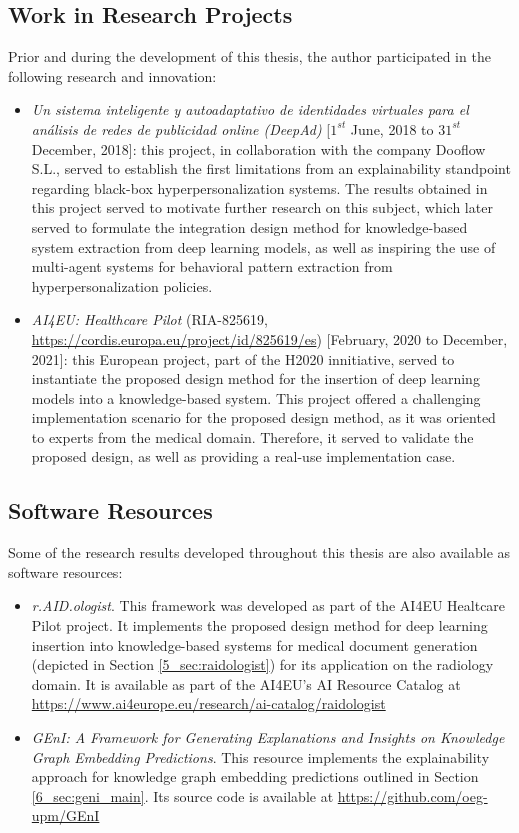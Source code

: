 \subsection{Work in Research Projects}
Prior and during the development of this thesis, the author participated in the following research and innovation:
\begin{itemize}
    \item \textit{Un sistema inteligente y autoadaptativo de identidades virtuales para el análisis de redes de publicidad online (DeepAd)} [$1^{st}$ June, 2018 to $31^{st}$ December, 2018]: this project, in collaboration with the company Dooflow S.L., served to establish the first limitations from an explainability standpoint regarding black-box hyperpersonalization systems. The results obtained in this project served to motivate further research on this subject, which later served to formulate the integration design method for knowledge-based system extraction from deep learning models, as well as inspiring the use of multi-agent systems for behavioral pattern extraction from hyperpersonalization policies.
    
    \item \textit{AI4EU: Healthcare Pilot} (RIA-825619, \url{https://cordis.europa.eu/project/id/825619/es}) [February, 2020 to December, 2021]: this European project, part of the H2020 innitiative, served to instantiate the proposed design method for the insertion of deep learning models into a knowledge-based system. This project offered a challenging implementation scenario for the proposed design method, as it was oriented to experts from the medical domain. Therefore, it served to validate the proposed design, as well as providing a real-use implementation case. 
\end{itemize}
\subsection{Software Resources}
Some of the research results developed throughout this thesis are also available as software resources:
\begin{itemize}
    \item \textit{r.AID.ologist}. This framework was developed as part of the AI4EU Healtcare Pilot project. It implements the proposed design method for deep learning insertion into knowledge-based systems for medical document generation (depicted in Section \ref{5_sec:raidologist}) for its application on the radiology domain. It is available as part of the AI4EU's AI Resource Catalog at
    \url{https://www.ai4europe.eu/research/ai-catalog/raidologist}
    
    \item \textit{GEnI: A Framework for Generating Explanations and Insights on Knowledge Graph Embedding Predictions}. This resource implements the explainability approach for knowledge graph embedding predictions outlined in Section \ref{6_sec:geni_main}. Its source code is available at \url{https://github.com/oeg-upm/GEnI}
\end{itemize}
